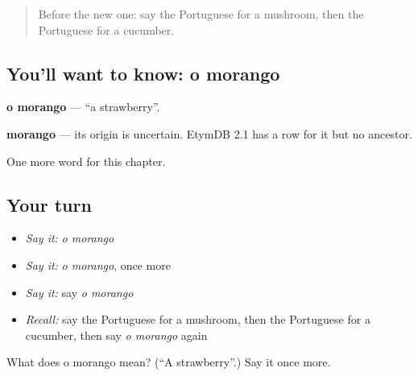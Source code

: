 \label{lesson:PT-C105-morango}



\begin{quote}
Before the new one: say the Portuguese for a mushroom, then the Portuguese for a cucumber.
\end{quote}

\subsection*{You'll want to know: o morango}
\textbf{o morango} — \textquotedblleft{}a strawberry\textquotedblright{}.

\begin{cousinweb}
\textbf{morango} — its origin is uncertain. EtymDB 2.1 has a row for it but no ancestor.
\end{cousinweb}

\begin{grammarlens}[title={What you've built}]
One more word for this chapter.
\end{grammarlens}

\subsection*{Your turn}
\begin{itemize}
\raggedright
  \item \emph{Say it:} \emph{o morango}
  \item \emph{Say it:} \emph{o morango}, once more
  \item \emph{Say it:} say \emph{o morango}
  \item \emph{Recall:} say the Portuguese for a mushroom, then the Portuguese for a cucumber, then say \emph{o morango} again
\end{itemize}

\begin{tcolorbox}[breakable,colback=teal!4,colframe=teal!35!black,title={Before you move on}]
What does o morango mean? (\textquotedblleft{}A strawberry\textquotedblright{}.) Say it once more.
\end{tcolorbox}
